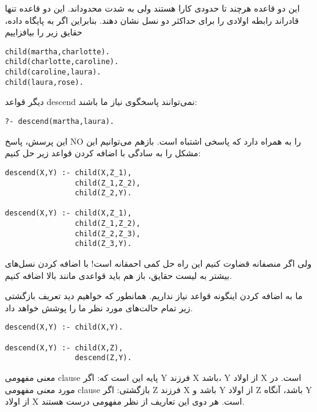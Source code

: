 این دو قاعده هرچند تا حدودی کارا هستند ولی به شدت محدوداند. این دو قاعده تنها قادراند رابطه اولادی را برای حداکثر دو نسل نشان دهند. بنابراین اگر به پایگاه داده، حقایق زیر را بیافزاییم

\begin{latin}
\begin{lstlisting}
child(martha,charlotte).
child(charlotte,caroline).
child(caroline,laura).
child(laura,rose).
\end{lstlisting}
\end{latin}

دیگر قواعد descend نمی‌توانند پاسخگوی نیاز ما باشند:

\begin{latin}
\begin{lstlisting}
?- descend(martha,laura).
\end{lstlisting}
\end{latin}

این پرسش، پاسخ NO را به همراه دارد که پاسخی اشتباه است. بازهم می‌توانیم این مشکل را به سادگی با اضافه کردن قواعد زیر حل کنیم:

\begin{latin}
\begin{lstlisting}
descend(X,Y) :- child(X,Z_1),
                child(Z_1,Z_2),
                child(Z_2,Y).

descend(X,Y) :- child(X,Z_1),
                child(Z_1,Z_2),
                child(Z_2,Z_3),
                child(Z_3,Y).
\end{lstlisting}
\end{latin}

ولی اگر منصفانه قضاوت کنیم این راه حل کمی احمقانه است! با اضافه کردن نسل‌های بیشتر به لیست حقایق، باز هم باید قواعدی مانند بالا اضافه کنیم.

ما به اضافه کردن اینگونه قواعد نیاز نداریم. همانطور که خواهیم دید تعریف بازگشتی زیر تمام حالت‌های مورد نظر ما را پوشش خواهد داد.

\begin{latin}
\begin{lstlisting}
descend(X,Y) :- child(X,Y).

descend(X,Y) :- child(X,Z),
                descend(Z,Y).
\end{lstlisting}
\end{latin}

معنی مفهومی clause پایه این است که: اگر Y فرزند X‌ باشد، Y از اولاد X است. در مورد معنی مفهومی clause بازگشتی: اگر Z فرزند X باشد و Y از اولاد Z باشد، آنگاه Y از اولاد X است. هر دوی این تعاریف از نظر مفهومی درست هستند.


